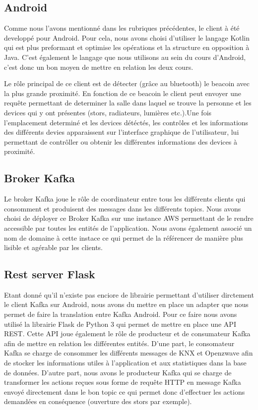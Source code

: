\subsection{Android}
Comme nous l'avons mentionné dans les rubriques précédentes, le client à été developpé pour Android. Pour cela, nous avons choisi d'utiliser le langage Kotlin qui est plus preformant et optimise les opérations et la structure en opposition à Java. C'est également le langage que nous utilisons au sein du cours d'Android, c'est donc un bon moyen de mettre en relation les deux cours.

Le rôle principal de ce client est de détecter (grâce au bluetooth) le beacoin avec la plus grande proximité. En fonction de ce beacoin le client peut envoyer une requête permettant de determiner la salle dans laquel se trouve la personne et les devices qui y ont présentes (stors, radiateurs, lumières etc.).Une fois l'emplacement determiné et les devices détéctés, les contrôles et les informations des différents devies apparaissent sur l'interface graphique de l'utilisateur, lui permettant de contrôller ou obtenir les différentes informations des devices à proximité. 

\subsection{Broker Kafka}
Le broker Kafka joue le rôle de coordinateur entre tous les différents clients qui consomment et produisent des messages dans les différents topics.
Nous avons choisi de déployer ce Broker Kafka sur une instance AWS permettant de le rendre accessible par toutes les entités de l'application.
Nous avons également associé un nom de domaine à cette instace ce qui permet de la référencer de manière plus lisible et agérable par les clients.

\subsection{Rest server Flask}
Etant donné qu'il n'existe pas enciore de librairie permettant d'utiliser dirctement le client Kafka sur Android, nous avons du mettre en place un adapter que nous permet de faire la translation entre Kafka Android.
Pour ce faire nous avons utilisé la librairie Flask de Python 3 qui permet de mettre en place une API REST.
Cette API joue également le rôle de producteur et de consumateur Kafka afin de mettre en relation les différentes entités.
D'une part, le consomateur Kafka se charge de consommer les différents messages de KNX et Openzwave afin de stocker les informations utiles à l'application et aux statistiques dans la base de données.
D'autre part, nous avons le producteur Kafka qui se charge de transformer les actions reçues sous forme de requête HTTP en message Kafka envoyé directement dans le bon topic ce qui permet donc d'effectuer les actions demandées en conséquence (ouverture des stors par exemple).

